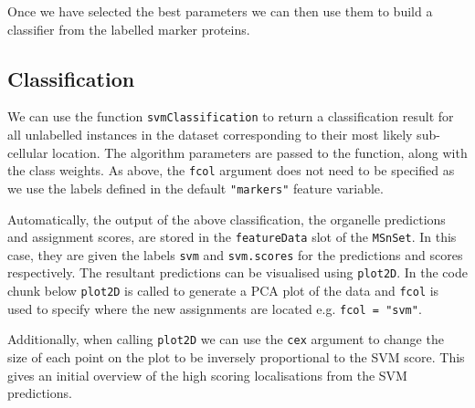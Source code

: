 Once we have selected the best parameters we can then use them to
build a classifier from the labelled marker proteins.


\subsection*{Classification}

We can use the function \texttt{svmClassification} to return a
classification result for all unlabelled instances in the dataset
corresponding to their most likely sub-cellular location. The
algorithm parameters are passed to the function, along with the class
weights. As above, the \texttt{fcol} argument does not need to be
specified as we use the labels defined in the default
\texttt{"markers"} feature variable.

\begin{knitrout}
\color{fgcolor}\begin{kframe}
\begin{alltt}
 \hlkwb{<-}     \hlstd{=} \hlstd{)}
\end{alltt}
\end{kframe}
\end{knitrout}

Automatically, the output of the above classification, the organelle
predictions and assignment scores, are stored in the
\texttt{featureData} slot of the \texttt{MSnSet}. In this case, they
are given the labels \texttt{svm} and \texttt{svm.scores} for the
predictions and scores respectively. The resultant predictions can be
visualised using \texttt{plot2D}. In the code chunk below
\texttt{plot2D} is called to generate a PCA plot of the data and
\texttt{fcol} is used to specify where the new assignments are located
e.g. \texttt{fcol = "svm"}.

Additionally, when calling \texttt{plot2D} we can use the \texttt{cex}
argument to change the size of each point on the plot to be inversely
proportional to the SVM score. This gives an initial overview of the
high scoring localisations from the SVM predictions.



